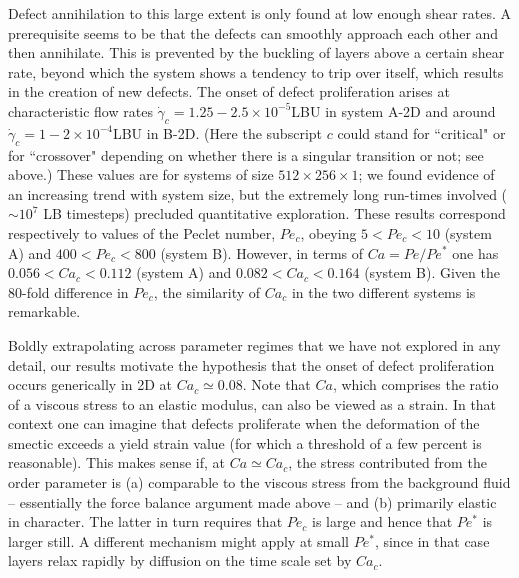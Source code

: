 \documentclass[8.5pt,twoside,twocolumn]{article}
\newcommand{\e}[1]{\times10^{#1}}
\begin{document}
Defect annihilation to this large extent is only found at low enough shear rates. A prerequisite seems to be that the defects can smoothly approach each other and then annihilate. This is prevented by the buckling of layers above a certain shear rate, beyond which the system shows a tendency to trip over itself, which results in the creation of new defects. The onset of defect proliferation arises at characteristic flow rates $\dot{\gamma}_c=1.25-2.5\e{-5}$LBU in system A-2D and around $\dot{\gamma}_c=1-2\e{-4}$LBU in B-2D. 
(Here the subscript $c$ could stand for ``critical" or for ``crossover" depending on whether there is a singular transition or not; see above.)
These values are for
systems of size $512\times256\times1$; we found evidence of an increasing trend with system size, but the extremely long run-times involved ($\sim 10^7$ LB timesteps) precluded quantitative exploration. These results correspond respectively to values of the Peclet number, $Pe_c$, obeying $5<Pe_c<10$ (system A) and $400<Pe_c<800$ (system B).  However, in terms of $Ca = Pe/Pe^*$ one has $0.056<Ca_c<0.112$ (system A) and $0.082<Ca_c<0.164$ (system B). Given the 80-fold difference in $Pe_c$, the similarity of $Ca_c$ in the two different systems is remarkable.

Boldly extrapolating across parameter regimes that we have not explored in any detail, our results motivate the hypothesis that the onset of defect proliferation occurs generically in 2D at $Ca_c\simeq 0.08$.  Note that $Ca$, which comprises the ratio of a viscous stress to an elastic modulus, can also be viewed as a strain. In that context one can imagine that defects proliferate when the deformation of the smectic exceeds a yield strain value (for which a threshold of a few percent is reasonable). This makes sense if, at $Ca \simeq Ca_c$, the stress contributed from the order parameter is (a) comparable to the viscous stress from the background fluid -- essentially the force balance argument made above -- and (b) primarily elastic in character. The latter in turn requires that $Pe_c$ is large and hence that $Pe^*$ is larger still. A different mechanism might apply at small $Pe^*$, since in that case layers relax rapidly by diffusion on the time scale set by $Ca_c$.
\end{document}

